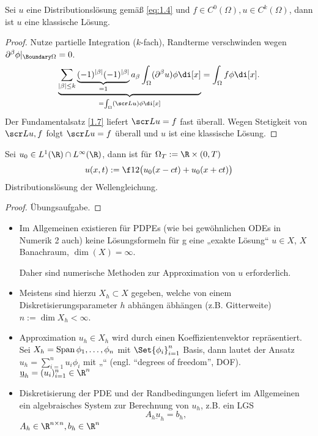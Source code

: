 \begin{st} \label{1.28}
	Sei $u$ eine Distributionslösung gemäß \eqref{eq:1.4} und $f \in C^0(\Omega), u \in C^k(\Omega)$, dann ist $u$ eine klassische Lösung.
	\begin{proof}
		Nutze partielle Integration ($k$-fach), Randterme verschwinden wegen $\partial^\beta \phi |_{\Boundary \Omega} = 0$.
		\[
			\underbrace{\sum_{|\beta|\le k} \underbrace{(-1)^{|\beta|} (-1)^{|\beta|}}_{=1} a_\beta \int_\Omega (\partial^\beta u) \phi \di[x]}_{= \int_\Omega (\scr L u) \phi \di[x]}
			= \int_\Omega f \phi \di[x].
		\]
		Der Fundamentalsatz \ref{1.7} liefert $\scr L u = f$ fast überall.
		Wegen Stetigkeit von $\scr L u, f$ folgt $\scr L u = f$ überall und $u$ ist eine klassische Lösung.
	\end{proof}
\end{st}

\begin{st} \label{1.29}
	Sei $u_0 \in L^1(\R) \cap L^\infty(\R)$, dann ist für $\Omega_T := \R \times (0,T)$
	\[
		u(x,t) := \f 12 \big( u_0(x-ct) + u_0(x+ct) \big)
	\]
	Distributionslösung der Wellengleichung.
	\begin{proof}
		Übungsaufgabe.
	\end{proof}
\end{st}

\begin{nt*}
	\begin{itemize}
		\item
			Im Allgemeinen existieren für PDPEs (wie bei gewöhnlichen ODEs in Numerik 2 auch) keine Lösungsformeln für g eine „exakte Lösung“ $u \in X$, $X$ Banachraum, $\dim(X) = \infty$.

			Daher sind numerische Methoden zur Approximation von $u$ erforderlich.
		\item
			Meistens sind hierzu  $X_h \subset X$ gegeben, welche von einem Diskretisierungsparameter $h$ abhängen äbhängen (z.B. Gitterweite) $n := \dim X_h < \infty$.
		\item
			Approximation $u_h \in X_h$ wird durch einen Koeffizientenvektor repräsentiert.
			Sei $X_h = \operatorname{Span}{\phi_1, \dotsc, \phi_n}$ mit $\Set{\phi_i}_{i=1}^n$ Basis, dann lautet der Ansatz $u_h = \sum_{i=1}^n u_i \phi_i$ mit „“ (engl. “degrees of freedom”, DOF).
			$\underbar{u}_h = (u_i)_{i=1}^n \in \R^n$
		\item
			Diskretisierung der PDE und der Randbedingungen liefert im Allgemeinen ein algebraisches System zur Berechnung von $u_h$, z.B. ein LGS
			\[
				A_h \underbar{u}_h = b_h,
			\]
			$A_h \in \R^{n\times n}, b_h \in \R^n$
	\end{itemize}
\end{nt*}

